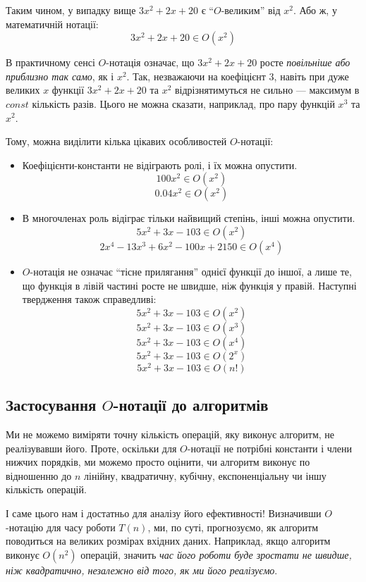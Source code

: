 \documentclass[12pt,a4paper]{report}
\begin{document}
Таким чином, у випадку вище \(3x^2 + 2x + 20\) є ``\(O\)-великим'' від \(x^2\).
Або ж, у математичній нотації:
\[3x^2 + 2x + 20 \in O(x^2)\]

В практичному сенсі \(O\)-нотація означає, що \(3x^2 + 2x + 20\) росте \emph{повільніше або приблизно так само}, як і \(x^2\).
Так, незважаючи на коефіцієнт \(3\), навіть при дуже великих \(x\) функції \(3x^2 + 2x + 20\) та \(x^2\) відрізнятимуться не сильно --- максимум в \(const\) кількість разів. Цього не можна сказати, наприклад, про пару функцій \(x^3\) та \(x^2\).

Тому, можна виділити кілька цікавих особливостей \(O\)-нотації:
\begin{itemize}
    \item Коефіцієнти-константи не відіграють ролі, і їх можна опустити.
        \[100x^2 \in O(x^2)\]
        \[0.04x^2 \in O(x^2)\]
    \item В многочленах роль відіграє тільки найвищий степінь, інші можна опустити.
        \[5x^2 + 3x - 103 \in O(x^2)\]
        \[2x^4 - 13x^3 + 6x^2 - 100x + 2150 \in O(x^4)\]
    \item \(O\)-нотація не означає ``тісне прилягання'' однієї функції до іншої, а лише те, що функція в лівій частині росте не швидше, ніж функція у правій. Наступні твердження також справедливі:
        \[5x^2 + 3x - 103 \in O(x^2)\]
        \[5x^2 + 3x - 103 \in O(x^3)\]
        \[5x^2 + 3x - 103 \in O(x^4)\]
        \[5x^2 + 3x - 103 \in O(2^x)\]
        \[5x^2 + 3x - 103 \in O(n!)\]

\end{itemize}


\subsection*{Застосування \(O\)-нотації до алгоритмів}

Ми не можемо виміряти точну кількість операцій, яку виконує алгоритм, не реалізувавши його.
Проте, оскільки для \(O\)-нотації не потрібні константи і члени нижчих порядків, ми можемо просто оцінити, чи алгоритм виконує по відношенню до \(n\) лінійну, квадратичну, кубічну, експоненціальну чи іншу кількість операцій.

І саме цього нам і достатньо для аналізу його ефективності!
Визначивши \(O\)-нотацію для часу роботи \(T(n)\), ми, по суті, прогнозуємо, як алгоритм поводиться на великих розмірах вхідних даних.
Наприклад, якщо алгоритм виконує \(O(n^2)\) операцій, значить \emph{час його роботи буде зростати не швидше, ніж квадратично, незалежно від того, як ми його реалізуємо}.
\end{document}
